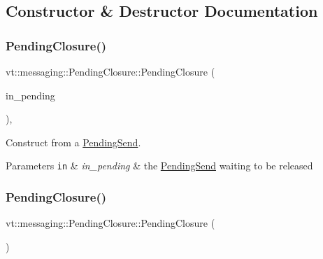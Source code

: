 \subsection{Constructor \& Destructor Documentation}
\mbox{\label{structvt_1_1messaging_1_1_pending_closure_aabf555d7b42f5d663b1ad499f09db9d4}} 
\subsubsection{\texorpdfstring{Pending\+Closure()}{PendingClosure()}\hspace{0.1cm}{\footnotesize\ttfamily [1/3]}}
{\footnotesize\ttfamily vt\+::messaging\+::\+Pending\+Closure\+::\+Pending\+Closure (\begin{DoxyParamCaption}\item[{\hyperlink{structvt_1_1messaging_1_1_pending_send}{Pending\+Send} \&\&}]{in\+\_\+pending }\end{DoxyParamCaption})\hspace{0.3cm}{\ttfamily [inline]}, {\ttfamily [explicit]}}



Construct from a {\ttfamily \hyperlink{structvt_1_1messaging_1_1_pending_send}{Pending\+Send}}. 


\begin{DoxyParams}[1]{Parameters}
\mbox{\tt in}  & {\em in\+\_\+pending} & the {\ttfamily \hyperlink{structvt_1_1messaging_1_1_pending_send}{Pending\+Send}} waiting to be released \\
\hline
\end{DoxyParams}
\mbox{\label{structvt_1_1messaging_1_1_pending_closure_a3e703c1f2ff98d8e1a04ad4306a1f011}} 
\subsubsection{\texorpdfstring{Pending\+Closure()}{PendingClosure()}\hspace{0.1cm}{\footnotesize\ttfamily [2/3]}}
{\footnotesize\ttfamily vt\+::messaging\+::\+Pending\+Closure\+::\+Pending\+Closure (\begin{DoxyParamCaption}\item[{\hyperlink{structvt_1_1messaging_1_1_pending_closure}{Pending\+Closure} const \&}]{ }\end{DoxyParamCaption})\hspace{0.3cm}{\ttfamily [delete]}}

